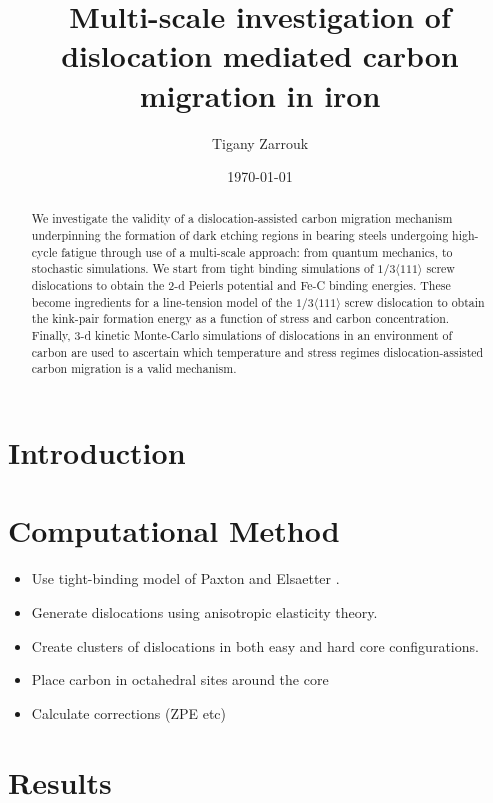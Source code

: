 \documentclass[a4paper]{article}
\author{Tigany Zarrouk}
\date{\today}
\title{Multi-scale investigation of dislocation mediated carbon migration in iron}
\begin{document}
\maketitle
\tableofcontents

\begin{abstract}

We investigate the validity of a dislocation-assisted carbon migration
mechanism underpinning the formation of dark etching regions in
bearing steels undergoing high-cycle fatigue through use of a
multi-scale approach: from quantum mechanics,
to stochastic simulations. We start from tight binding simulations of
$1/3\langle 111 \rangle$ screw dislocations to obtain the 2-d Peierls
potential and Fe-C binding energies. These become ingredients for a line-tension
model of the $1/3\langle 111 \rangle$ screw dislocation to obtain the kink-pair formation
energy as a function of stress and carbon concentration. Finally,
3-d kinetic Monte-Carlo simulations of dislocations in an environment
of carbon are used to ascertain which temperature and stress regimes
dislocation-assisted carbon migration is a valid mechanism. 

\end{abstract}


\section{Introduction}
\label{sec:org119db83}

\section{Computational Method}
\label{sec:org48d89b7}

\begin{itemize}
\item Use tight-binding model of Paxton and Elsaetter \cite{Paxton2013}.
\item Generate dislocations using anisotropic elasticity theory.
\item Create clusters of dislocations in both easy and hard core
configurations.
\item Place carbon in octahedral sites around the core
\item Calculate corrections (ZPE etc)
\end{itemize}


\section{Results}
\label{sec:orgb5deb11}
\end{document}
